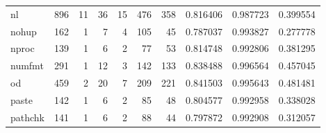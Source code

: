 \begin{longtable}{lrrrrrrrrr}
nl        &                    896 &                                 11 &                                36 &                               15 &                               476 &                             358 &                                0.816406 &                               0.987723 &                             0.399554 \\
nohup     &                    162 &                                  1 &                                 7 &                                4 &                               105 &                              45 &                                0.787037 &                               0.993827 &                             0.277778 \\
nproc     &                    139 &                                  1 &                                 6 &                                2 &                                77 &                              53 &                                0.814748 &                               0.992806 &                             0.381295 \\
numfmt    &                    291 &                                  1 &                                12 &                                3 &                               142 &                             133 &                                0.838488 &                               0.996564 &                             0.457045 \\
od        &                    459 &                                  2 &                                20 &                                7 &                               209 &                             221 &                                0.841503 &                               0.995643 &                             0.481481 \\
paste     &                    142 &                                  1 &                                 6 &                                2 &                                85 &                              48 &                                0.804577 &                               0.992958 &                             0.338028 \\
pathchk   &                    141 &                                  1 &                                 6 &                                2 &                                88 &                              44 &                                0.797872 &                               0.992908 &                             0.312057 \\

\end{longtable}
